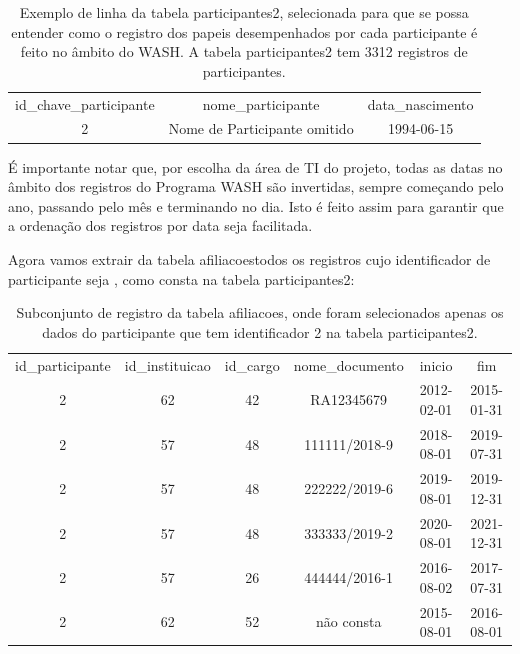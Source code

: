 \documentclass[
12pt,		%
openright,	%
twoside,  %
a4paper,			%
chapter=TITLE,		%
english,			%
french,				%
spanish,			%
brazil				%
]{USPSC-classe/USPSC}
\begin{document}
\begin{table}[htb]
\tiny
\caption{\label{2c8d9dda4031f0ea459292d025586b4d3e57ed84}Exemplo de linha da tabela participantes2, selecionada para que se possa entender como o registro dos papeis desempenhados por cada participante \'e feito no \^ambito do WASH. A tabela participantes2 tem 3312 registros de participantes.}

\centering
\begin{tabular}{|c|c|c|}
\hline
id\_chave\_participante  &  nome\_participante             &  data\_nascimento  \\
                     2  &  Nome de Participante omitido  &  1994-06-15 \\
\hline
\end{tabular}
\end{table}


\'E importante notar que, por escolha da \'area de TI do projeto, todas as datas no \^ambito dos registros do Programa WASH s\~ao invertidas, sempre come\c{c}ando pelo ano, passando pelo m\^es e terminando no dia. Isto \'e feito assim para garantir que a ordena\c{c}\~ao dos registros por data seja facilitada.




Agora vamos extrair da tabela \textquotedbl afiliacoes\textquotedbl  todos os registros cujo identificador de participante seja \textquotedbl , como consta na tabela participantes2:








\begin{table}[htb]
\tiny
\caption{\label{e6120545268b93238330297571c4756e7c97df1a}Subconjunto de registro da tabela afiliacoes, onde foram selecionados apenas os dados do participante que tem identificador 2 na tabela participantes2.}

\centering
\begin{tabular}{|c|c|c|c|c|c|}
\hline
id\_participante  &  id\_instituicao  &  id\_cargo  &  nome\_documento  &  inicio      &  fim \\
              2  &              62  &        42  &  RA12345679      &  2012-02-01  &  2015-01-31  \\
              2  &              57  &        48  &  111111/2018-9   &  2018-08-01  &  2019-07-31  \\
              2  &              57  &        48  &  222222/2019-6   &  2019-08-01  &  2019-12-31  \\
              2  &              57  &        48  &  333333/2019-2   &  2020-08-01  &  2021-12-31  \\
              2  &              57  &        26  &  444444/2016-1   &  2016-08-02  &  2017-07-31  \\
              2  &              62  &        52  &  n\~ao consta      &  2015-08-01  &  2016-08-01 \\
\hline
\end{tabular}
\end{table}
\end{document}
